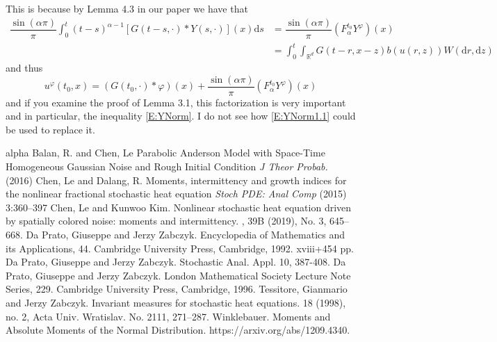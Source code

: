 \documentclass{article}
\numberwithin{equation}{section}
\newcommand{\R}{\mathbb{R}}
\newcommand{\ud}{\ensuremath{\mathrm{d}}}
\begin{document}
This is because by Lemma 4.3 in our paper we have that 
	\begin{align*}
		\dfrac{\sin(\alpha \pi)}{\pi}\int_0^t(t-s)^{\alpha-1}\left[G(t-s,\cdot)*Y(s,\cdot)\right](x) \ud s &=	\dfrac{\sin(\alpha \pi)}{\pi}\left(F_{\alpha}^{t_0}Y^{\varphi}\right)(x)
		\\&= \int_0^t  \int_{\R^d} G(t-r,x-z)b(u(r,z)) W(\ud r,\ud z)
	\end{align*}
and thus 
	\[
		u^\varphi(t_0,x) = (G(t_0,\cdot) * \varphi)(x) + \dfrac{\sin(\alpha \pi)}{\pi}\left(F_{\alpha}^{t_0}Y^{\varphi}\right)(x)
	\]
and if you examine the proof of Lemma 3.1, this factorization is very important and in particular, the inequality \eqref{E:YNorm}. I do not see how \eqref{E:YNorm1.1} could be used to replace it. 

\begin{small}%
	\begin{thebibliography}{alpha}
		Balan, R. and Chen, Le
		\newblock Parabolic Anderson Model with Space-Time Homogeneous Gaussian Noise and Rough Initial Condition
		\newblock \textit{J Theor Probab.} (2016)
		Chen, Le and Dalang, R.
		\newblock Moments, intermittency and growth indices for the
		nonlinear fractional stochastic heat equation
		\newblock \textit{Stoch PDE: Anal Comp} (2015) 3:360–397
		Chen, Le and Kunwoo Kim.
		\newblock Nonlinear stochastic heat equation driven by spatially colored noise: moments and intermittency.
		, 39B (2019), No. 3, 645--668.
		Da Prato, Giuseppe and Jerzy Zabczyk.
		Encyclopedia of Mathematics and its Applications, 44. Cambridge University Press, Cambridge, 1992. xviii+454 pp.
		Da Prato, Giuseppe and Jerzy Zabczyk.
		Stochastic Anal. Appl. 10, 387-408.
		Da Prato, Giuseppe and Jerzy Zabczyk.
		\newblock London Mathematical Society Lecture Note Series, 229. Cambridge University Press, Cambridge, 1996.
		Tessitore, Gianmario and Jerzy Zabczyk.
		\newblock Invariant measures for stochastic heat equations.
		 18 (1998), no. 2, Acta Univ. Wratislav. No. 2111, 271--287.
		Winklebauer.
		\newblock Moments and Absolute Moments of the
		Normal Distribution.
		 https://arxiv.org/abs/1209.4340.
	\end{thebibliography}
\end{small}
\end{document}
